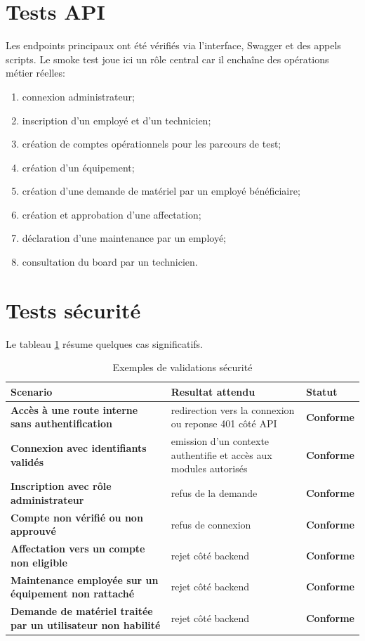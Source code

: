 \section{Tests API}
Les endpoints principaux ont été vérifiés via l'interface, Swagger et des appels scripts. Le smoke test joue ici un rôle central car il enchaîne des opérations métier réelles:
\begin{enumerate}
  \item connexion administrateur;
  \item inscription d'un employé et d'un technicien;
  \item création de comptes opérationnels pour les parcours de test;
  \item création d'un équipement;
  \item création d'une demande de matériel par un employé bénéficiaire;
  \item création et approbation d'une affectation;
  \item déclaration d'une maintenance par un employé;
  \item consultation du board par un technicien.
\end{enumerate}

\section{Tests sécurité}
Le tableau \ref{tab:tests-securite} résume quelques cas significatifs.

\begin{table}[H]
\centering
\caption{Exemples de validations sécurité}
\label{tab:tests-securite}
\begin{tabularx}{\textwidth}{>{\bfseries}p{4cm}X>{\bfseries}p{2cm}}
\toprule
Scenario & Resultat attendu & Statut \\
\midrule
Accès à une route interne sans authentification & redirection vers la connexion ou reponse 401 côté API & Conforme \\
Connexion avec identifiants validés & emission d'un contexte authentifie et accès aux modules autorisés & Conforme \\
Inscription avec rôle administrateur & refus de la demande & Conforme \\
Compte non vérifié ou non approuvé & refus de connexion & Conforme \\
Affectation vers un compte non eligible & rejet côté backend & Conforme \\
Maintenance employée sur un équipement non rattaché & rejet côté backend & Conforme \\
Demande de matériel traitée par un utilisateur non habilité & rejet côté backend & Conforme \\
\bottomrule
\end{tabularx}
\end{table}

